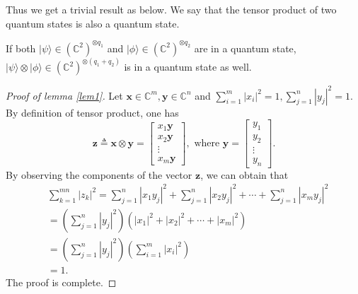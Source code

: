 Thus we get a trivial result as below. We say that the tensor product of two quantum states is also a quantum state. 

\begin{corollary}\label{cor1}
If both $|\psi\rangle \in \left(\mathbb{C}^2\right)^{\otimes q_{1}} $ and $|\phi\rangle  \in \left(\mathbb{C}^2\right)^{\otimes q_{2}} $ are in a quantum state, $|\psi\rangle \otimes|\phi\rangle \in \left(\mathbb{C}^2\right)^{\otimes (q_{1}+q_{2})} $ is in a quantum state as well.
\end{corollary}

\begin{proof}[Proof of lemma \ref{lem1}]
    Let $\mathbf{x} \in \mathbb{C}^m,\mathbf{y} \in \mathbb{C}^n$ and $ \sum_{i=1}^m\left|x_i\right|^2=1, \sum_{j=1}^n\left|y_j\right|^2=1.$
    By definition of tensor product, one has
    \begin{equation}
    \mathbf{z} \triangleq \mathbf{x} \otimes \mathbf{y}=\left[\begin{array}{c}
    x_1 \mathbf{y} \\
    x_2 \mathbf{y} \\
    \vdots \\
    x_m \mathbf{y}
    \end{array}\right], \text { where } \mathbf{y}=\left[\begin{array}{c}
    y_1 \\
    y_2 \\
    \vdots \\
    y_n
    \end{array}\right].
    \end{equation}
    By observing the components of the vector $\mathbf{z}$, we can obtain that
    \begin{equation*}
        \begin{aligned}
        & \sum_{k=1}^{m n}\left|z_k\right|^2=\sum_{j=1}^n\left|x_1 y_j\right|^2+\sum_{j=1}^n\left|x_2 y_j\right|^2+\cdots+\sum_{j=1}^n\left|x_m y_j\right|^2 \\
        & =\left(\sum_{j=1}^n\left|y_j\right|^2\right)\left(\left|x_1\right|^2+\left|x_2\right|^2+\cdots+\left|x_m\right|^2\right) \\
        & =\left(\sum_{j=1}^n\left|y_j\right|^2\right)
        \left(\sum_{i=1}^m\left|x_i\right|^2\right) \\
        & =1.
        \end{aligned}
    \end{equation*}
    The proof is complete.
\end{proof}









